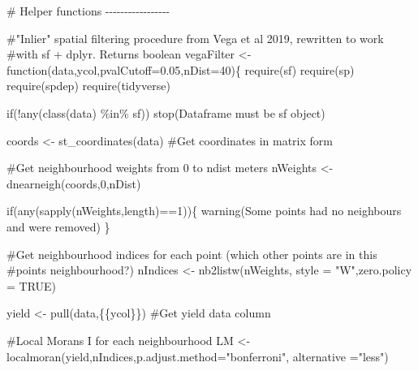 \documentclass[]{elsarticle} %
\newenvironment{Shaded}{}{}
\newcommand{\AttributeTok}[1]{#1}
\newcommand{\CommentTok}[1]{\textcolor[rgb]{0.00,0.50,0.00}{#1}}
\newcommand{\ConstantTok}[1]{#1}
\newcommand{\ControlFlowTok}[1]{\textcolor[rgb]{0.00,0.00,1.00}{#1}}
\newcommand{\DecValTok}[1]{#1}
\newcommand{\FloatTok}[1]{#1}
\newcommand{\FunctionTok}[1]{#1}
\newcommand{\NormalTok}[1]{#1}
\newcommand{\OtherTok}[1]{\textcolor[rgb]{1.00,0.25,0.00}{#1}}
\newcommand{\SpecialCharTok}[1]{\textcolor[rgb]{0.00,0.50,0.50}{#1}}
\newcommand{\StringTok}[1]{\textcolor[rgb]{0.00,0.50,0.50}{#1}}
\begin{document}
\begin{Shaded}
\begin{Highlighting}[]
\CommentTok{\# Helper functions {-}{-}{-}{-}{-}{-}{-}{-}{-}{-}{-}{-}{-}{-}{-}{-}{-}}

\CommentTok{\#"Inlier" spatial filtering procedure from Vega et al 2019, rewritten to work}
\CommentTok{\#with sf + dplyr. Returns boolean}
\NormalTok{vegaFilter }\OtherTok{\textless{}{-}} \ControlFlowTok{function}\NormalTok{(data,ycol,}\AttributeTok{pvalCutoff=}\FloatTok{0.05}\NormalTok{,}\AttributeTok{nDist=}\DecValTok{40}\NormalTok{)\{}
  \FunctionTok{require}\NormalTok{(sf)}
  \FunctionTok{require}\NormalTok{(sp)}
  \FunctionTok{require}\NormalTok{(spdep)}
  \FunctionTok{require}\NormalTok{(tidyverse)}
  
  \ControlFlowTok{if}\NormalTok{(}\SpecialCharTok{!}\FunctionTok{any}\NormalTok{(}\FunctionTok{class}\NormalTok{(data) }\SpecialCharTok{\%in\%} \StringTok{\textquotesingle{}sf\textquotesingle{}}\NormalTok{)) }\FunctionTok{stop}\NormalTok{(}\StringTok{\textquotesingle{}Dataframe must be sf object\textquotesingle{}}\NormalTok{)}
  
\NormalTok{  coords }\OtherTok{\textless{}{-}} \FunctionTok{st\_coordinates}\NormalTok{(data) }\CommentTok{\#Get coordinates in matrix form}
  
  \CommentTok{\#Get neighbourhood weights from 0 to ndist meters}
\NormalTok{  nWeights }\OtherTok{\textless{}{-}} \FunctionTok{dnearneigh}\NormalTok{(coords,}\DecValTok{0}\NormalTok{,nDist) }
  
  \ControlFlowTok{if}\NormalTok{(}\FunctionTok{any}\NormalTok{(}\FunctionTok{sapply}\NormalTok{(nWeights,length)}\SpecialCharTok{==}\DecValTok{1}\NormalTok{))\{}
    \FunctionTok{warning}\NormalTok{(}\StringTok{\textquotesingle{}Some points had no neighbours and were removed\textquotesingle{}}\NormalTok{)}
\NormalTok{  \} }
  
  \CommentTok{\#Get neighbourhood indices for each point (which other points are in this}
  \CommentTok{\#point\textquotesingle{}s neighbourhood?)}
\NormalTok{  nIndices }\OtherTok{\textless{}{-}} \FunctionTok{nb2listw}\NormalTok{(nWeights, }\AttributeTok{style =} \StringTok{"W"}\NormalTok{,}\AttributeTok{zero.policy =} \ConstantTok{TRUE}\NormalTok{) }
  
\NormalTok{  yield }\OtherTok{\textless{}{-}} \FunctionTok{pull}\NormalTok{(data,\{\{ycol\}\}) }\CommentTok{\#Get yield data column}
  
  \CommentTok{\#Local Moran\textquotesingle{}s I for each neighbourhood}
\NormalTok{  LM }\OtherTok{\textless{}{-}} \FunctionTok{localmoran}\NormalTok{(yield,nIndices,}\AttributeTok{p.adjust.method=}\StringTok{"bonferroni"}\NormalTok{,}
                   \AttributeTok{alternative =}\StringTok{"less"}\NormalTok{)}
  

\end{Highlighting}
\end{Shaded}
\end{document}
